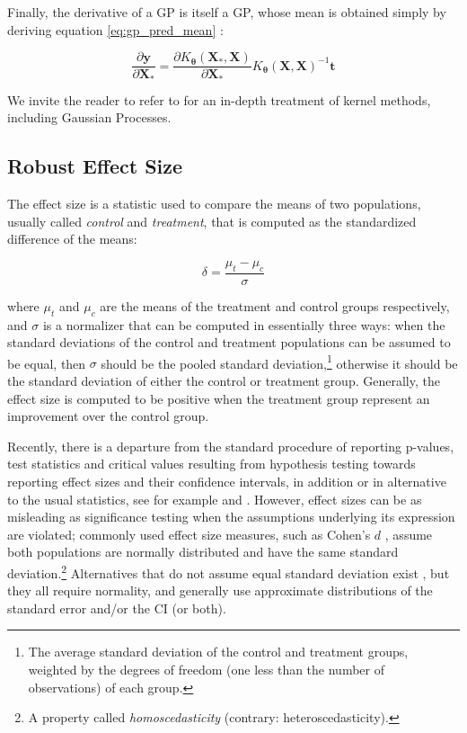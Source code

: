 \documentclass[a4paper,11pt]{kth-mag}
\begin{document}
Finally, the derivative of a GP is itself a GP, whose mean is obtained simply by deriving equation \ref{eq:gp_pred_mean} \citep{gp_diff}:

\begin{equation}
\label{eq:gp_gradient}
\frac{\partial\bm y}{\partial\bm X_*}=\frac{\partial K_{\bm\theta}(\bm X_*,\bm X)}{\partial\bm X_*}K_{\bm\theta}(\bm X,\bm X)^{-1}\bm t
\end{equation}

We invite the reader to refer to \cite[Chapter~6]{bishop} for an in-depth treatment of kernel methods, including Gaussian Processes.


\subsection{Robust Effect Size}
\label{sec:effect_size}
The effect size is a statistic used to compare the means of two populations, usually called \emph{control} and \emph{treatment}, that is computed as the standardized difference of the means:

\begin{equation}
\label{eq:base_es}
\delta=\frac{\mu_t-\mu_c}{\sigma}
\end{equation}

\noindent where $\mu_t$ and $\mu_c$ are the means of the treatment and control groups respectively, and $\sigma$ is a normalizer that can be computed in essentially three ways: when the standard deviations of the control and treatment populations can be assumed to be equal, then $\sigma$ should be the pooled standard deviation,\footnote{The average standard deviation of the control and treatment groups, weighted by the degrees of freedom (one less than the number of observations) of each group.} otherwise it should be the standard deviation of either the control or treatment group. Generally, the effect size is computed to be positive when the treatment group represent an improvement over the control group.

Recently, there is a departure from the standard procedure of reporting p-values, test statistics and critical values resulting from hypothesis testing towards reporting effect sizes and their confidence intervals, in addition or in alternative to the usual statistics, see for example \cite{apa} and \cite{aera}.  However, effect sizes can be as misleading as significance testing when the assumptions underlying its expression are violated; commonly used effect size measures, such as Cohen's $d$ \citep{cohen1988spa}, assume both populations are normally distributed and have the same standard deviation.\footnote{A property called \emph{homoscedasticity} (contrary: heteroscedasticity).} Alternatives that do not assume equal standard deviation exist \citep{es1,es2,es3}, but they all require normality, and generally use approximate distributions of the standard error and/or the CI (or both).
\end{document}
